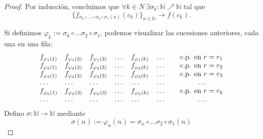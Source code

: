 \begin{proof}
    Por inducci\'on, concluimos que
    $
    \forall k\in N \ \exists \sigma_k :\mathbb N \nearrow \mathbb N
    $ tal que
    \[
      \{ f_{\sigma_k \circ \dots \circ \sigma_2 \circ\sigma_1 (n)}
      (c_k) \}_{n\in\mathbb N} \longrightarrow f(c_k).
    \]

    Si definimos $\varphi_k:= \sigma_k \circ \dots \sigma_2 \circ\sigma_1$, podemos visualizar las sucesiones anteriores, cada una en una fila:
    \[
      \begin{array}{lllllll}
        {f_{\varphi_1 (1)}}& f_{\varphi_1 (2)} & f_{\varphi_1 (3)} & \dots &f_{\varphi_1 (k)} & \dots & \hspace{0.25cm} \mbox{ c.p. en } r=r_1
        \\
        f_{\varphi_2 (1)} & {f_{\varphi_2 (2)}} & f_{\varphi_2 (3)} & \dots &f_{\varphi_2 (k)} & \dots & \hspace{0.25cm} \mbox{ c.p. en } r=r_2
        \\
        f_{\varphi_3 (1)} & f_{\varphi_3 (2)} & {f_{\varphi_3 (3)}} & \dots &f_{\varphi_3 (k)} & \dots & \hspace{0.25cm} \mbox{ c.p. en } r=r_3
        \\
        \dots & \dots & \dots& \dots &\dots & \dots & \hspace{1.25cm} \dots
        \\
        f_{\varphi_k (1)} & f_{\varphi_k (2)} & f_{\varphi_k (3)} & \dots &{f_{\varphi_k (k)}} & \dots & \hspace{0.25cm} \mbox{ c.p. en } r=r_k
        \\
        \dots & \dots & \dots& \dots &\dots & \dots & \hspace{1.25cm} \dots
      \end{array}
    \]
    Defino $\sigma:\mathbb N\longrightarrow \mathbb N$ mediante
    \[
      \sigma (n):= \varphi_n(n)= \sigma_n \circ \dots \sigma_2 \circ\sigma_1 (n)
    \]


\end{proof}
